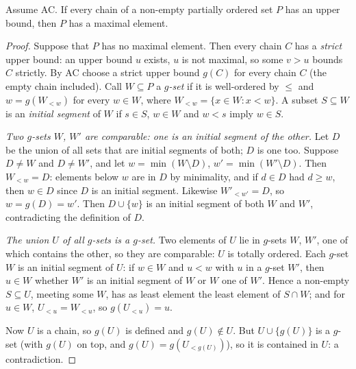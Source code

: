 \begin{theorem}\label{thm:zorn}
Assume AC. If every chain of a non-empty partially ordered set $P$ has an upper bound, then $P$ has a maximal element.
\end{theorem}
\begin{proof}
Suppose that $P$ has no maximal element. Then every chain $C$ has a \emph{strict} upper bound: an upper bound $u$ exists, $u$ is not
maximal, so some $v>u$ bounds $C$ strictly. By AC choose a strict upper bound $g(C)$ for every chain $C$ (the empty chain included).
Call $W\subseteq P$ a \emph{$g$-set} if it is well-ordered by $\le$ and $w=g(W_{<w})$ for every $w\in W$, where $W_{<w}=\{x\in W:x<w\}$. A subset $S\subseteq W$
is an \emph{initial segment} of $W$ if $s\in S$, $w\in W$ and $w<s$ imply $w\in S$.

\emph{Two $g$-sets $W$, $W'$ are comparable: one is an initial segment of the other.} Let $D$ be the union of all sets that are initial
segments of both; $D$ is one too. Suppose $D\ne W$ and $D\ne W'$, and let $w=\min(W\setminus D)$, $w'=\min(W'\setminus D)$. Then $W_{<w}=D$: elements below $w$
are in $D$ by minimality, and if $d\in D$ had $d\ge w$, then $w\in D$ since $D$ is an initial segment. Likewise $W'_{<w'}=D$, so $w=g(D)=w'$. Then
$D\cup\{w\}$ is an initial segment of both $W$ and $W'$, contradicting the definition of $D$.

\emph{The union $U$ of all $g$-sets is a $g$-set.} Two elements of $U$ lie in $g$-sets $W$, $W'$, one of which contains the other, so they
are comparable: $U$ is totally ordered. Each $g$-set $W$ is an initial segment of $U$: if $w\in W$ and $u<w$ with $u$ in a $g$-set $W'$,
then $u\in W$ whether $W'$ is an initial segment of $W$ or $W$ one of $W'$. Hence a non-empty $S\subseteq U$, meeting some $W$, has as least element
the least element of $S\cap W$; and for $u\in W$, $U_{<u}=W_{<u}$, so $g(U_{<u})=u$.

Now $U$ is a chain, so $g(U)$ is defined and $g(U)\notin U$. But $U\cup\{g(U)\}$ is a $g$-set (with $g(U)$ on top, and $g(U)=g(U_{<g(U)})$), so it is
contained in $U$: a contradiction.
\end{proof}

